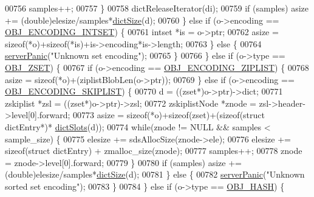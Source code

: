 \begin{DoxyCode}
{00756                 samples++;
00757             \}
00758             dictReleaseIterator(di);
00759             \textcolor{keywordflow}{if} (samples) asize += (\textcolor{keywordtype}{double})elesize/samples*\hyperlink{dict_8h_af193430dd3d5579a52b194512f72c1f0}{dictSize}(d);
00760         \} \textcolor{keywordflow}{else} \textcolor{keywordflow}{if} (o->encoding == \hyperlink{server_8h_a214173987de21c3b7661fddd42b05873}{OBJ\_ENCODING\_INTSET}) \{
00761             intset *is = o->ptr;
00762             asize = \textcolor{keyword}{sizeof}(*o)+\textcolor{keyword}{sizeof}(*is)+is->encoding*is->length;
00763         \} \textcolor{keywordflow}{else} \{
00764             \hyperlink{server_8h_a11cc378e7778a830b41240578de3b204}{serverPanic}(\textcolor{stringliteral}{"Unknown set encoding"});
00765         \}
00766     \} \textcolor{keywordflow}{else} \textcolor{keywordflow}{if} (o->type == \hyperlink{server_8h_a8c356422ddbc03bd77694880a30a1953}{OBJ\_ZSET}) \{
00767         \textcolor{keywordflow}{if} (o->encoding == \hyperlink{server_8h_aabf064ede983103f1fd0df2086e84eee}{OBJ\_ENCODING\_ZIPLIST}) \{
00768             asize = \textcolor{keyword}{sizeof}(*o)+(ziplistBlobLen(o->ptr));
00769         \} \textcolor{keywordflow}{else} \textcolor{keywordflow}{if} (o->encoding == \hyperlink{server_8h_acfb35db5cb30ed113ed23aeb1a224c4c}{OBJ\_ENCODING\_SKIPLIST}) \{
00770             d = ((zset*)o->ptr)->dict;
00771             zskiplist *zsl = ((zset*)o->ptr)->zsl;
00772             zskiplistNode *znode = zsl->header->level[0].forward;
00773             asize = \textcolor{keyword}{sizeof}(*o)+\textcolor{keyword}{sizeof}(zset)+(\textcolor{keyword}{sizeof}(\textcolor{keyword}{struct} dictEntry*)*
      \hyperlink{dict_8h_aca9596be4bcc2caa07c17dd8cebcceec}{dictSlots}(d));
00774             \textcolor{keywordflow}{while}(znode != NULL && samples < sample\_size) \{
00775                 elesize += sdsAllocSize(znode->ele);
00776                 elesize += \textcolor{keyword}{sizeof}(\textcolor{keyword}{struct} dictEntry) + zmalloc\_size(znode);
00777                 samples++;
00778                 znode = znode->level[0].forward;
00779             \}
00780             \textcolor{keywordflow}{if} (samples) asize += (\textcolor{keywordtype}{double})elesize/samples*\hyperlink{dict_8h_af193430dd3d5579a52b194512f72c1f0}{dictSize}(d);
00781         \} \textcolor{keywordflow}{else} \{
00782             \hyperlink{server_8h_a11cc378e7778a830b41240578de3b204}{serverPanic}(\textcolor{stringliteral}{"Unknown sorted set encoding"});
00783         \}
00784     \} \textcolor{keywordflow}{else} \textcolor{keywordflow}{if} (o->type == \hyperlink{server_8h_a87c05ba4f7f36741864277f02a4423fb}{OBJ\_HASH}) \{
}
\end{DoxyCode}
